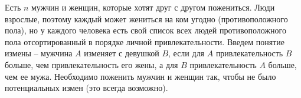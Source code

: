 \begin{problem}
    Есть $n$ мужчин и женщин, которые хотят друг с другом пожениться. Люди взрослые, поэтому каждый может жениться на ком угодно (противоположного пола), но у каждого человека есть свой список всех людей противоположного пола отсортированный в порядке личной привлекательности. Введем понятие измены -- мужчина $A$ изменяет с девушкой $B$, если для $A$ привлекательность $B$ больше, чем привлекательность его жены, а для $B$ привлекательность $A$ больше, чем ее мужа. Необходимо поженить мужчин и женщин так, чтобы не было потенциальных измен (это всегда возможно).
\end{problem}








